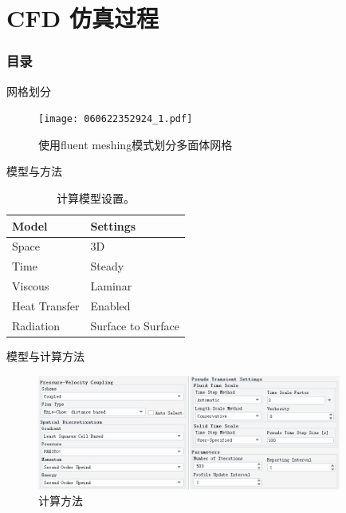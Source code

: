 \documentclass[UTF8,9pt]{ctexbeamer}
\begin{document}
\section{CFD 仿真过程}

\begin{frame}

\frametitle{目录}

\tableofcontents[currentsection]

\end{frame}


\begin{frame}{网格划分}
	
	\begin{figure}
		\texttt{[image: 060622352924\_1.pdf]}
		\caption{使用fluent meshing模式划分多面体网格}
	\end{figure}	
\end{frame}
\begin{frame}{模型与方法}
	\begin{table}[]
		\begin{tabular}{l|l}
		\hline
		Model           & Settings           \\ \hline
		Space           & 3D                 \\
		Time            & Steady             \\
		Viscous         & Laminar            \\ 
		Heat   Transfer & Enabled            \\
		Radiation       & Surface to Surface \\
        \hline
		\end{tabular}
		\caption[]{计算模型设置。}
	\end{table}
\end{frame}
\begin{frame}{模型与计算方法}
	\begin{figure}
		\includegraphics[width=10cm]{figure4.jpg}
		\caption{计算方法}
	\end{figure}	
\end{frame}
\end{document}
